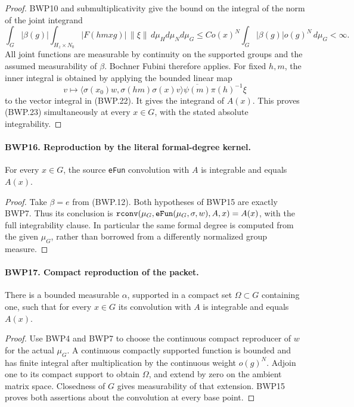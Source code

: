 \documentclass[11pt,a4paper]{article}
\numberwithin{equation}{section}
\theoremstyle{remark}\newtheorem{remark}[theorem]{Remark}
\begin{document}
\begin{proof}
BWP10 and submultiplicativity give the bound on the integral of the
norm of the joint integrand
\[
 \int_G |\beta(g)|
 \int_{H_z\times N_0}|F(hmxg)|\,\|\xi\|\,d\mu_Hd\mu_Nd\mu_G
 \le C o(x)^N\int_G|\beta(g)|o(g)^N\,d\mu_G<\infty.
\]
All joint functions are measurable by continuity on the supported
groups and the assumed measurability of \(\beta\).
Bochner Fubini therefore applies.  For fixed \(h,m\), the inner
integral is obtained by applying the bounded linear map
\[
 v\longmapsto
 \langle\sigma(x_0)w,\sigma(hm)\sigma(x)v\rangle
 \overline{\psi(m)}\pi(h)^{-1}\xi
\]
to the vector integral in (BWP.22).  It gives the integrand of
\(A(x)\).  This proves (BWP.23) simultaneously at every
\(x\in G\), with the stated absolute integrability.
\end{proof}

\paragraph{BWP16. Reproduction by the literal formal-degree kernel.}
\label{claim:BWP16}
For every \(x\in G\), the source \texttt{e\allowbreak Fun} convolution
with \(A\) is integrable and equals \(A(x)\).

\begin{proof}
Take \(\beta=e\) from (BWP.12).  Both hypotheses of BWP15
are exactly BWP7.  Thus its conclusion is
\(\texttt{rconv}(\mu_G,\texttt{e\allowbreak Fun}(\mu_G,\sigma,w),A,x)=A(x)\),
with the full integrability clause.  In particular the same formal
degree is computed from the given \(\mu_G\), rather than borrowed
from a differently normalized group measure.
\end{proof}

\paragraph{BWP17. Compact reproduction of the packet.}
\label{claim:BWP17}
There is a bounded measurable \(\alpha\), supported in a compact
set \(\Omega\subset G\) containing one, such that for every
\(x\in G\) its convolution with \(A\) is integrable and
equals \(A(x)\).

\begin{proof}
Use BWP4 and BWP7 to choose the continuous compact reproducer of
\(w\) for the actual \(\mu_G\).  A continuous compactly supported
function is bounded and has finite integral after multiplication by
the continuous weight \(o(g)^N\).  Adjoin one to its compact support
to obtain \(\Omega\), and extend by zero on the ambient matrix
space.  Closedness of \(G\) gives measurability of that extension.
BWP15 proves both assertions about the convolution at every base point.
\end{proof}
\end{document}
